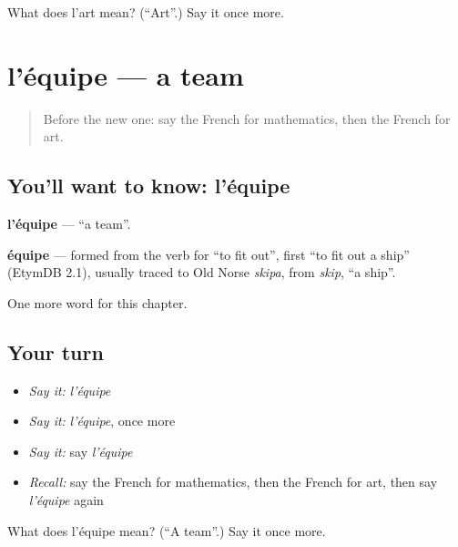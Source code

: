 \begin{tcolorbox}[breakable,colback=teal!4,colframe=teal!35!black,title={Before you move on}]
What does l'art mean? (\textquotedblleft{}Art\textquotedblright{}.) Say it once more.
\end{tcolorbox}
\section[l'équipe]{l'équipe — a team}

\label{lesson:FR-C257-equipe}



\begin{quote}
Before the new one: say the French for mathematics, then the French for art.
\end{quote}

\subsection*{You'll want to know: l'équipe}
\textbf{l'équipe} — \textquotedblleft{}a team\textquotedblright{}.

\begin{cousinweb}
\textbf{équipe} — formed from the verb for \textquotedblleft{}to fit out\textquotedblright{}, first \textquotedblleft{}to fit out a ship\textquotedblright{} (EtymDB 2.1), usually traced to Old Norse \emph{skipa}, from \emph{skip}, \textquotedblleft{}a ship\textquotedblright{}.
\end{cousinweb}

\begin{grammarlens}[title={What you've built}]
One more word for this chapter.
\end{grammarlens}

\subsection*{Your turn}
\begin{itemize}
\raggedright
  \item \emph{Say it:} \emph{l'équipe}
  \item \emph{Say it:} \emph{l'équipe}, once more
  \item \emph{Say it:} say \emph{l'équipe}
  \item \emph{Recall:} say the French for mathematics, then the French for art, then say \emph{l'équipe} again
\end{itemize}

\begin{tcolorbox}[breakable,colback=teal!4,colframe=teal!35!black,title={Before you move on}]
What does l'équipe mean? (\textquotedblleft{}A team\textquotedblright{}.) Say it once more.
\end{tcolorbox}
